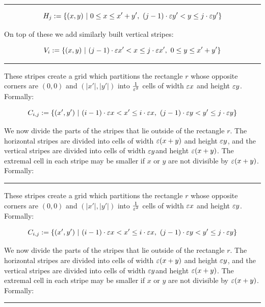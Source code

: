 \documentclass[12pt]{article}%
\begin{document}
\hrule

\begin{equation}
    H_{j}:=\{(x,y)~|~  0 \leq x \leq x'+y'  ,~ (j-1)\cdot \varepsilon y' < y
    \leq j\cdot \varepsilon y'\}
\end{equation}

On top of these we add similarly built vertical stripes:

\begin{equation}
    V_{i}:=\{(x,y)~|~ (j-1)\cdot \varepsilon x' < x \leq j\cdot \varepsilon x',~ 0
    \leq y \leq x'+y' \}
\end{equation}

\hrule

These stripes create a grid which partitions the rectangle $r$ whose
opposite corners are $(0,0)$ and $(|x'|,|y'|)$ into $\frac{1}{\varepsilon^2}$
cells of width $\varepsilon x$ and height $\varepsilon y$. Formally:

\begin{equation}
    C_{i,j}:=\{(x',y')~|~  (i-1)\cdot \varepsilon x < x' \leq i\cdot \varepsilon x,~
    (j-1)\cdot \varepsilon y< y' \leq j\cdot \varepsilon y\}
\end{equation}

We now divide the parts of the stripes that lie outside of the
rectangle $r$. The horizontal stripes are divided into cells of width
$\varepsilon(x+y)$ and height $\varepsilon y$, and the vertical stripes are divided
into cells of width $\varepsilon y$and height $\varepsilon(x+y)$. The extremal cell
in each stripe may be smaller if $x$ or $y$ are not divisible by
$\varepsilon(x+y)$. Formally:

\hrule

These stripes create a grid which partitions the rectangle $r$ whose
opposite corners are $(0,0)$ and $(|x'|,|y'|)$ into $\frac{1}{\varepsilon^2}$
cells of width $\varepsilon x$ and height $\varepsilon y$. Formally:

\begin{equation}
    C_{i,j}:=\{(x',y')~|~  (i-1)\cdot \varepsilon x < x' \leq i\cdot \varepsilon x,~
    (j-1)\cdot \varepsilon y< y' \leq j\cdot \varepsilon y\}
\end{equation}

We now divide the parts of the stripes that lie outside of the
rectangle $r$. The horizontal stripes are divided into cells of width
$\varepsilon(x+y)$ and height $\varepsilon y$, and the vertical stripes are divided
into cells of width $\varepsilon y$and height $\varepsilon(x+y)$. The extremal cell
in each stripe may be smaller if $x$ or $y$ are not divisible by
$\varepsilon(x+y)$. Formally:

\hrule
\end{document}
